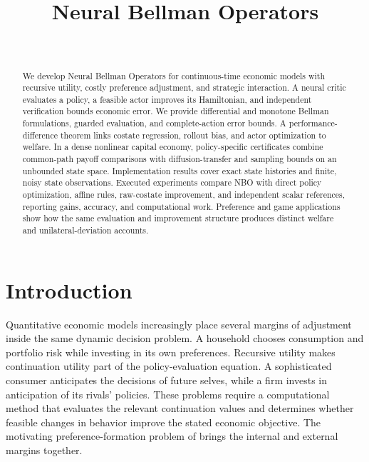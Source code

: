 \documentclass[ecta,nameyear,draft]{econsocart}
\theoremstyle{definition}
\theoremstyle{remark}
\begin{document}
\begin{frontmatter}
\title{Neural Bellman Operators}
\begin{aug}
\author[id=au1,addressref={add1}]{~}
\address[id=add1]{Peking University}
\end{aug}
\begin{abstract}
We develop Neural Bellman Operators for continuous-time economic models with recursive utility, costly preference adjustment, and strategic interaction. A neural critic evaluates a policy, a feasible actor improves its Hamiltonian, and independent verification bounds economic error. We provide differential and monotone Bellman formulations, guarded evaluation, and complete-action error bounds. A performance-difference theorem links costate regression, rollout bias, and actor optimization to welfare. In a dense nonlinear capital economy, policy-specific certificates combine common-path payoff comparisons with diffusion-transfer and sampling bounds on an unbounded state space. Implementation results cover exact state histories and finite, noisy state observations. Executed experiments compare NBO with direct policy optimization, affine rules, raw-costate improvement, and independent scalar references, reporting gains, accuracy, and computational work. Preference and game applications show how the same evaluation and improvement structure produces distinct welfare and unilateral-deviation accounts.
\end{abstract}
\begin{keyword}
\end{keyword}
\end{frontmatter}

\section{Introduction}\label{sec:introduction}
Quantitative economic models increasingly place several margins of adjustment inside the same dynamic decision problem. A household chooses consumption and portfolio risk while investing in its own preferences. Recursive utility makes continuation utility part of the policy-evaluation equation. A sophisticated consumer anticipates the decisions of future selves, while a firm invests in anticipation of its rivals' policies. These problems require a computational method that evaluates the relevant continuation values and determines whether feasible changes in behavior improve the stated economic objective. The motivating preference-formation problem of \citet{qi2025} brings the internal and external margins together.
\end{document}
